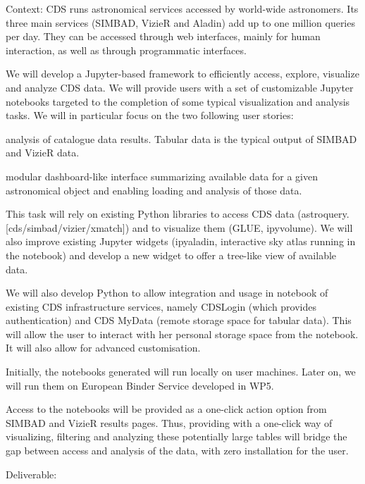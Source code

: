 \begin{task}[
  title=Astro application,
  id=astro,
  lead=CDS,
  PM=18,
  wphases={0-48},
  partners={CDS}
]

  Context: CDS runs astronomical services accessed by world-wide astronomers. 
Its three main services (SIMBAD, VizieR and Aladin) add up to one million
queries per day.  They can be accessed through web interfaces, mainly for human
interaction, as well as through programmatic interfaces.
    
  We will develop a Jupyter-based framework to efficiently access, explore, 
visualize and analyze CDS data. 
 We will provide users with a set of customizable Jupyter notebooks targeted
to the completion of some typical visualization and analysis tasks. We will
in particular focus on the two following user stories:
    \begin{compactitem}
        \item analysis of catalogue data results. Tabular data is the typical
              output of SIMBAD and VizieR data.
         \item modular dashboard-like interface summarizing available data
               for a given astronomical object and enabling loading and
               analysis of those data.
    \end{compactitem}


  This task will rely on existing Python libraries to access CDS data
(astroquery.[cds/simbad/vizier/xmatch]) and to visualize them (GLUE, ipyvolume).
We will also improve existing Jupyter widgets (ipyaladin, interactive sky atlas
running in the notebook) and develop a new widget to offer a tree-like view
of available data.
    
  We will also develop Python to allow integration and usage in notebook of
existing CDS infrastructure services, namely CDSLogin (which provides
authentication) and CDS MyData (remote storage space for tabular data).
This will allow the user to interact with her personal storage space from
the notebook. It will also allow for advanced customisation.
  
  Initially, the notebooks generated will run locally on user machines.
Later on, we will run them on European Binder Service developed in WP5.

  Access to the notebooks will be provided as a one-click action option from
SIMBAD and VizieR results pages.
  Thus, providing with a one-click way of visualizing, filtering and analyzing
these potentially large tables will bridge the gap between access and analysis
of the data, with zero installation for the user.

    Deliverable: 
\end{task}

